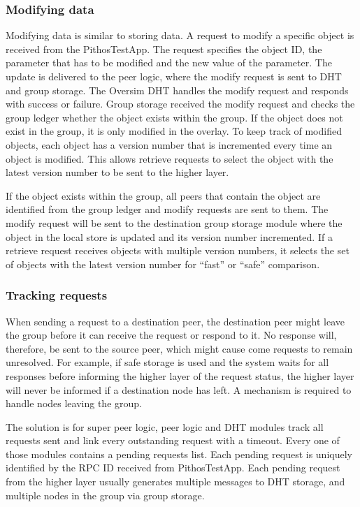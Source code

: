     \subsubsection{Modifying data}
    \label{modify_implementation}

    Modifying data is similar to storing data. A request to modify a specific object is received from the PithosTestApp. The request specifies the object ID, the parameter that has to be modified and the new value of the parameter. The update is delivered to the peer logic, where the modify request is sent to DHT and group storage. The Oversim DHT handles the modify request and responds with success or failure. Group storage received the modify request and checks the group ledger whether the object exists within the group. If the object does not exist in the group, it is only modified in the overlay. To keep track of modified objects, each object has a version number that is incremented every time an object is modified. This allows retrieve requests to select the object with the latest version number to be sent to the higher layer.

    If the object exists within the group, all peers that contain the object are identified from the group ledger and modify requests are sent to them. The modify request will be sent to the destination group storage module where the object in the local store is updated and its version number incremented. If a retrieve request receives objects with multiple version numbers, it selects the set of objects with the latest version number for ``fast'' or ``safe'' comparison.

    \subsubsection{Tracking requests}
    \label{pending_rpcs_implementation}

    When sending a request to a destination peer, the destination peer might leave the group before it can receive the request or respond to it. No response will, therefore, be sent to the source peer, which might cause come requests to remain unresolved. For example, if safe storage is used and the system waits for all responses before informing the higher layer of the request status, the higher layer will never be informed if a destination node has left. A mechanism is required to handle nodes leaving the group.

    The solution is for super peer logic, peer logic and DHT modules track all requests sent and link every outstanding request with a timeout. Every one of those modules contains a pending requests list. Each pending request is uniquely identified by the RPC ID received from PithosTestApp. Each pending request from the higher layer usually generates multiple messages to DHT storage, and multiple nodes in the group via group storage.

